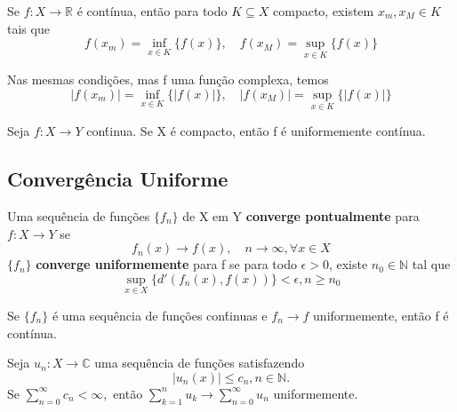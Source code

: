 \documentclass[complex.tex]{subfiles}
\begin{document}
\begin{crl*}
	Se $f:X\rightarrow \mathbb{R}$ é contínua, então para todo $K \subseteq{X}$ compacto, existem $x _{m}, x _{M}\in{K}$
	tais que
	$$
		f(x _{m}) = \inf _{x\in{K}} \{f(x)\}, \quad f(x _{M}) = \sup _{x\in{K}} \{f(x)\}
	$$
\end{crl*}
\begin{crl*}
	Nas mesmas condições, mas f uma função complexa, temos
	$$
		|f(x _{m})| = \inf _{x\in{K}} \{|f(x)|\}, \quad |f(x _{M})| = \sup _{x\in{K}} \{|f(x)|\}
	$$
\end{crl*}
\begin{theorem*}
	Seja $f:X\rightarrow Y$ con\'tinua. Se X é compacto, então f é uniformemente contínua.
\end{theorem*}

\subsection{Convergência Uniforme}
\begin{def*}
	Uma sequência de funções $\{f_{n}\}$ de X em Y \textbf{converge pontualmente} para $f:X\rightarrow Y$ se
	$$
		f_{n}(x)\to f(x), \quad n\to\infty, \forall{x\in{X}}
	$$
	$\{f_{n}\}$ \textbf{converge uniformemente} para f se para todo $\epsilon > 0$, existe $n_{0}\in \mathbb{N}$ tal que
	$$
		\sup _{x\in{X}} \{d'(f_{n}(x), f(x))\} < \epsilon, n\geq{n_{0}}
	$$
\end{def*}
\begin{theorem*}
	Se $\{f_{n}\}$ é uma sequência de funções con\'tinuas e $f_{n}\to{f}$ uniformemente, então f é contínua.
\end{theorem*}
\begin{theorem*}
	Seja $u_{n}:X\rightarrow \mathbb{C}$ uma sequência de funções satisfazendo
	$$
		|u_{n}(x)|\leq c_{n}, n\in \mathbb{N}.
	$$
	Se $\sum\limits_{n=0}^{\infty}c_{n} < \infty,$ então $\sum\limits_{k=1}^{n}u_{k}\to \sum\limits_{n=0}^{\infty}u_{n}$ uniformemente.
\end{theorem*}
\end{document}
